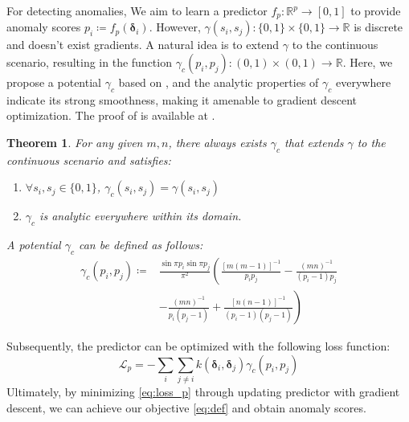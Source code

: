 \documentclass{article}
\newtheorem{theorem}{Theorem}[section]
\begin{document}
For detecting anomalies, We aim to learn a predictor $f_p:\mathbb{R}^p \rightarrow [0, 1]$ to provide anomaly scores $p_i \coloneqq f_p(\bm{\delta}_i)$.
However, $\gamma(s_i, s_j): \{0, 1\} \times \{0, 1\} \rightarrow \mathbb{R}$ is discrete and doesn't exist gradients.
A natural idea is to extend $\gamma$ to the continuous scenario, resulting in the function $\gamma_c(p_i, p_j): (0, 1) \times (0, 1) \rightarrow \mathbb{R}$.
Here, we propose a potential $\gamma_c$ based on , and the analytic properties of $\gamma_c$ everywhere indicate its strong smoothness, making it amenable to gradient descent optimization.
The proof of  is available at .
\begin{theorem}\label{th:gamma_c}
    For any given $m, n$, there always exists $\gamma_c$ that extends $\gamma$ to the continuous scenario and satisfies:
    \begin{enumerate}[(1)]
        \item $\forall s_i, s_j \in \{0, 1\}$, $\gamma_c(s_i, s_j)=\gamma(s_i, s_j)$
        \item $\gamma_c$ is analytic everywhere within its domain.
    \end{enumerate}
    A potential $\gamma_c$ can be defined as follows:
    \begin{equation}\label{eq:gamma_c}
        \begin{aligned}
            \gamma_c(p_i, p_j) \coloneqq & \frac{\sin\pi p_i \sin\pi p_j}{\pi^2}\left(\frac{[m(m-1)]^{-1}}{p_ip_j} - \frac{(mn)^{-1}}{(p_i-1)p_j} \right.\\
            & \left.- \frac{(mn)^{-1}}{p_i(p_j-1)} + \frac{[n(n-1)]^{-1}}{(p_i-1)(p_j-1)}\right)
        \end{aligned}
    \end{equation}
\end{theorem}
Subsequently, the predictor can be optimized with the following loss function:
\begin{equation}\label{eq:loss_p}
    \mathcal{L}_p = -\sum_{i}\sum_{j\neq i} k(\bm{\delta}_i, \bm{\delta}_j) \gamma_c(p_i, p_j)
\end{equation}
Ultimately, by minimizing \eqref{eq:loss_p} through updating predictor with gradient descent, we can achieve our objective \eqref{eq:def} and obtain anomaly scores.
\end{document}
